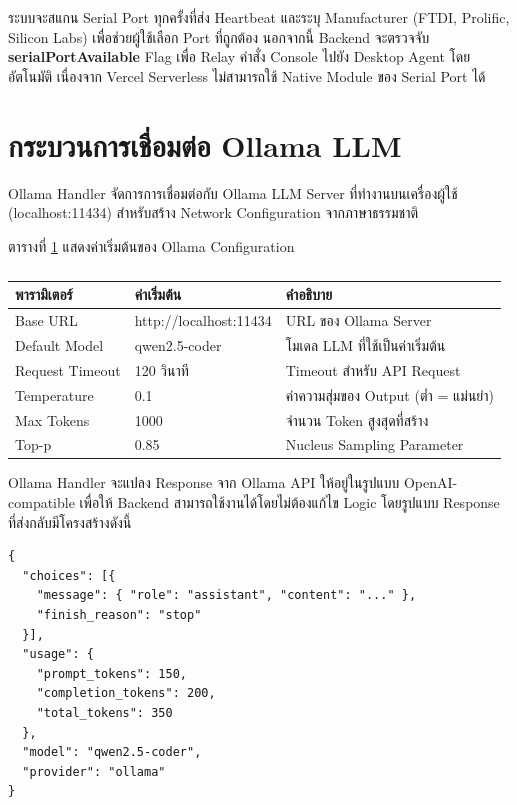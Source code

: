 \hspace*{1.3em}
ระบบจะสแกน Serial Port ทุกครั้งที่ส่ง Heartbeat และระบุ Manufacturer (FTDI, Prolific, Silicon Labs) เพื่อช่วยผู้ใช้เลือก Port ที่ถูกต้อง นอกจากนี้ Backend จะตรวจจับ \textbf{serialPortAvailable} Flag เพื่อ Relay คำสั่ง Console ไปยัง Desktop Agent โดยอัตโนมัติ เนื่องจาก Vercel Serverless ไม่สามารถใช้ Native Module ของ Serial Port ได้

\section{กระบวนการเชื่อมต่อ Ollama LLM}
\hspace*{1.3em}
Ollama Handler จัดการการเชื่อมต่อกับ Ollama LLM Server ที่ทำงานบนเครื่องผู้ใช้ (localhost:11434) สำหรับสร้าง Network Configuration จากภาษาธรรมชาติ

\hspace*{1.3em}
ตารางที่ \ref{tabD2:OllamaConfig} แสดงค่าเริ่มต้นของ Ollama Configuration

\begin{table}[H]
\centering
\caption{}
\label{tabD2:OllamaConfig}
\fontSixTeen
\begin{tabularx}{\textwidth}{|l|l|X|}
\hline
\textbf{พารามิเตอร์} & \textbf{ค่าเริ่มต้น} & \textbf{คำอธิบาย} \\
\hline
Base URL & http://localhost:11434 & URL ของ Ollama Server \\
\hline
Default Model & qwen2.5-coder & โมเดล LLM ที่ใช้เป็นค่าเริ่มต้น \\
\hline
Request Timeout & 120 วินาที & Timeout สำหรับ API Request \\
\hline
Temperature & 0.1 & ค่าความสุ่มของ Output (ต่ำ = แม่นยำ) \\
\hline
Max Tokens & 1000 & จำนวน Token สูงสุดที่สร้าง \\
\hline
Top-p & 0.85 & Nucleus Sampling Parameter \\
\hline
\end{tabularx}
\end{table}

\hspace*{1.3em}
Ollama Handler จะแปลง Response จาก Ollama API ให้อยู่ในรูปแบบ OpenAI-compatible เพื่อให้ Backend สามารถใช้งานได้โดยไม่ต้องแก้ไข Logic โดยรูปแบบ Response ที่ส่งกลับมีโครงสร้างดังนี้

\begin{verbatim}
{
  "choices": [{
    "message": { "role": "assistant", "content": "..." },
    "finish_reason": "stop"
  }],
  "usage": {
    "prompt_tokens": 150,
    "completion_tokens": 200,
    "total_tokens": 350
  },
  "model": "qwen2.5-coder",
  "provider": "ollama"
}
\end{verbatim}

